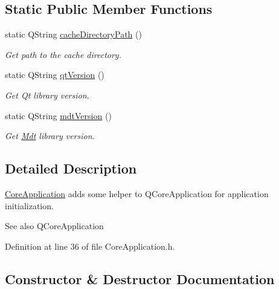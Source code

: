 \subsection*{Static Public Member Functions}
\begin{DoxyCompactItemize}
\item 
static Q\+String \hyperlink{class_mdt_1_1_core_application_aa5bf79da0eda7f8dedd2b78bf8025449}{cache\+Directory\+Path} ()
\begin{DoxyCompactList}\small\item\em Get path to the cache directory. \end{DoxyCompactList}\item 
static Q\+String \hyperlink{class_mdt_1_1_core_application_a0509073283a3a23e4ee3cf248739e15c}{qt\+Version} ()
\begin{DoxyCompactList}\small\item\em Get Qt library version. \end{DoxyCompactList}\item 
static Q\+String \hyperlink{class_mdt_1_1_core_application_a43d5e4e3b163250cba37c0071fb9f7ea}{mdt\+Version} ()
\begin{DoxyCompactList}\small\item\em Get \hyperlink{namespace_mdt}{Mdt} library version. \end{DoxyCompactList}\end{DoxyCompactItemize}


\subsection{Detailed Description}
\hyperlink{class_mdt_1_1_core_application}{Core\+Application} adds some helper to Q\+Core\+Application for application initialization. 

\begin{DoxySeeAlso}{See also}
Q\+Core\+Application 
\end{DoxySeeAlso}


Definition at line 36 of file Core\+Application.\+h.



\subsection{Constructor \& Destructor Documentation}
